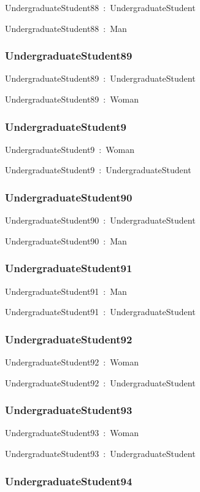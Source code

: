 \documentclass{article}
\begin{document}
UndergraduateStudent88~:~UndergraduateStudent

UndergraduateStudent88~:~Man

\subsubsection*{UndergraduateStudent89}

UndergraduateStudent89~:~UndergraduateStudent

UndergraduateStudent89~:~Woman

\subsubsection*{UndergraduateStudent9}

UndergraduateStudent9~:~Woman

UndergraduateStudent9~:~UndergraduateStudent

\subsubsection*{UndergraduateStudent90}

UndergraduateStudent90~:~UndergraduateStudent

UndergraduateStudent90~:~Man

\subsubsection*{UndergraduateStudent91}

UndergraduateStudent91~:~Man

UndergraduateStudent91~:~UndergraduateStudent

\subsubsection*{UndergraduateStudent92}

UndergraduateStudent92~:~Woman

UndergraduateStudent92~:~UndergraduateStudent

\subsubsection*{UndergraduateStudent93}

UndergraduateStudent93~:~Woman

UndergraduateStudent93~:~UndergraduateStudent

\subsubsection*{UndergraduateStudent94}
\end{document}
